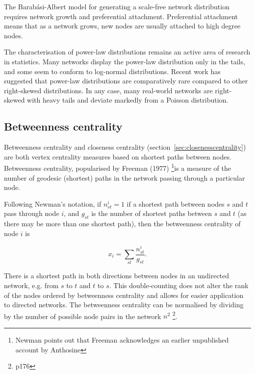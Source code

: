 The Barab\'asi-Albert model for generating a scale-free network distribution requires network growth and preferential attachment. Preferential attachment means that as a network grows, new nodes are usually attached to high degree nodes\cite{barabasi1999emergence}.

The characterisation of power-law distributions remains an active area of research in statistics. Many networks display the power-law distribution only in the tails, and some seem to conform to log-normal distributions. Recent work has suggested that power-law distributions are comparatively rare compared to other right-skewed distributions\cite{broido2019scale}.  In any case, many real-world networks are right-skewed with heavy tails and deviate markedly from a Poisson distribution. 


\subsection{Betweenness centrality }
\label{sec:Betweeness centrality}
Betweenness centrality and closeness centrality (section~\ref{sec:closenesscentrality})  are both vertex centrality measures based on shortest paths between nodes\cite{newman2018networks}.  Betweenness centrality, popularised by Freeman (1977) \cite{freeman1977set}\footnote{Newman \cite{newman2018networks} points out that Freeman acknowledges an earlier unpublished account by Anthosine}is a measure of the number of geodesic (shortest) paths in the network passing through a particular node. 

 Following Newman's notation\cite{newman2018networks}, if $n_{st}^i=1$  if a shortest path between nodes $s$ and $t$ pass through node $i$, and  $g_{st}$ is the number of shortest paths between $s$ and $t$ (as there may be more than one shortest path), then the betweenness centrality of node $i$ is

\begin{equation}
    x_i = \sum_{st} \frac{n_{st}^i}{g_{st}}.
\end{equation}
\label{eq: Betweenness centrality}

There is a shortest path in both directions between nodes in an undirected network, e.g. from $s$ to $t$ and $t$ to $s$. This double-counting does not alter the rank of the nodes ordered by betweenness centrality and allows for easier application to directed networks\cite{newman2018networks}. The betweenness centrality can be normalised by dividing by the number of possible node pairs in the network $n^2$\cite{newman2018networks} \footnote{p176}.

